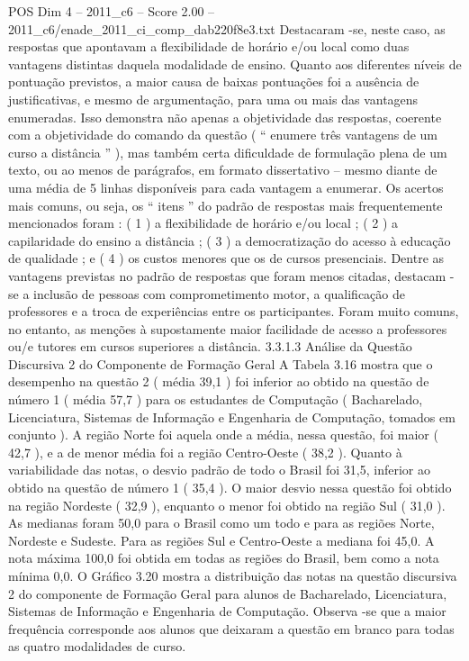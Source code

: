 \begin{textsample}{POS Dim 4 – 2011\_c6 – Score 2.00 – 2011\_c6/enade\_2011\_ci\_comp\_dab220f8e3.txt}
Destacaram -se, neste caso, as respostas que apontavam a flexibilidade de horário e/ou local como duas vantagens distintas daquela modalidade de ensino.
Quanto aos diferentes níveis de pontuação previstos, a maior causa de baixas pontuações foi a ausência de justificativas, e mesmo de argumentação, para uma ou mais das vantagens enumeradas.
Isso demonstra não apenas a objetividade das respostas, coerente com a objetividade do comando da questão ( “ enumere três vantagens de um curso a distância ” ), mas também certa dificuldade de formulação plena de um texto, ou ao menos de parágrafos, em formato dissertativo – mesmo diante de uma média de 5 linhas disponíveis para cada vantagem a enumerar.
Os acertos mais comuns, ou seja, os “ itens ” do padrão de respostas mais frequentemente mencionados foram : ( 1 ) a flexibilidade de horário e/ou local ; ( 2 ) a capilaridade do ensino a distância ; ( 3 ) a democratização do acesso à educação de qualidade ; e ( 4 ) os custos menores que os de cursos presenciais.
Dentre as vantagens previstas no padrão de respostas que foram menos citadas, destacam -se a inclusão de pessoas com comprometimento motor, a qualificação de professores e a troca de experiências entre os participantes.
Foram muito comuns, no entanto, as menções à supostamente maior facilidade de acesso a professores ou/e tutores em cursos superiores a distância. 3.3.1.3 Análise da Questão Discursiva 2 do Componente de Formação Geral A Tabela 3.16 mostra que o desempenho na questão 2 ( média 39,1 ) foi inferior ao obtido na questão de número 1 ( média 57,7 ) para os estudantes de Computação ( Bacharelado, Licenciatura, Sistemas de Informação e Engenharia de Computação, tomados em conjunto ).
A região Norte foi aquela onde a média, nessa questão, foi maior ( 42,7 ), e a de menor média foi a região Centro-Oeste ( 38,2 ).
Quanto à variabilidade das notas, o desvio padrão de todo o Brasil foi 31,5, inferior ao obtido na questão de número 1 ( 35,4 ).
O maior desvio nessa questão foi obtido na região Nordeste ( 32,9 ), enquanto o menor foi obtido na região Sul ( 31,0 ).
As medianas foram 50,0 para o Brasil como um todo e para as regiões Norte, Nordeste e Sudeste.
Para as regiões Sul e Centro-Oeste a mediana foi 45,0.
A nota máxima 100,0 foi obtida em todas as regiões do Brasil, bem como a nota mínima 0,0.
O Gráfico 3.20 mostra a distribuição das notas na questão discursiva 2 do componente de Formação Geral para alunos de Bacharelado, Licenciatura, Sistemas de Informação e Engenharia de Computação.
Observa -se que a maior frequência corresponde aos alunos que deixaram a questão em branco para todas as quatro modalidades de curso.

\end{textsample}
